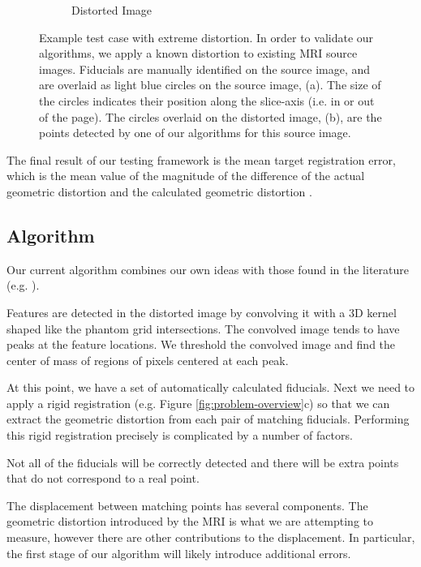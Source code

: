 \documentclass[12pt]{article}
\begin{document}
\begin{figure}
\begin{subfigure}[b]{0.48\textwidth}
        \caption{Distorted Image}
        \label{fig:test-case_2}
    \end{subfigure}
    \caption{Example test case with extreme distortion.  In order to validate our algorithms, we apply a known distortion to existing MRI source images.  Fiducials are manually identified on the source image, and are overlaid as light blue circles on the source image, (a).  The size of the circles indicates their position along the slice-axis (i.e. in or out of the page).  The circles overlaid on the distorted image, (b), are the points detected by one of our algorithms for this source image.}
    \label{fig:test-case}
\end{figure}

The final result of our testing framework is the mean target registration error, which is the mean value of the magnitude of the difference of the actual geometric distortion and the calculated geometric distortion \cite[page R37]{hill2001}.

\subsection*{Algorithm}

Our current algorithm combines our own ideas with those found in the literature (e.g. \cite{stanescu2010,baldwin2007}).  

Features are detected in the distorted image by convolving it with a 3D kernel shaped like the phantom grid intersections.  The convolved image tends to have peaks at the feature locations.  We threshold the convolved image and find the center of mass of regions of pixels centered at each peak.

At this point, we have a set of automatically calculated fiducials.  Next we need to apply a rigid registration (e.g. Figure \ref{fig:problem-overview}c) so that we can extract the geometric distortion from each pair of matching fiducials.  Performing this rigid registration precisely is complicated by a number of factors.

Not all of the fiducials will be correctly detected and there will be extra points that do not correspond to a real point.

The displacement between matching points has several components.  The geometric distortion introduced by the MRI is what we are attempting to measure, however there are other contributions to the displacement.  In particular, the first stage of our algorithm will likely introduce additional errors.
\end{document}
